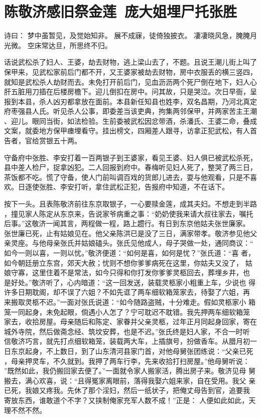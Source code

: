 \chapter{陈敬济感旧祭金莲~庞大姐埋尸托张胜}

诗曰：
梦中虽暂见，及觉始知非。
展不成寐，徒倚独披衣。
凄凄晓风急，腌腌月光微。
空床常达旦，所思终不归。

话说武松杀了妇人、王婆，劫去财物，逃上梁山去了，不题。且说王潮儿街上叫了
保甲来，见武松家前后门都不开，又王婆家被劫去财物，房中衣服丢的横三竖四，
就知是武松杀人劫财而去。未免打开前后门，见血沥沥两个死尸倒在地下，妇人心
肝五脏用刀插在后楼房檐下。迎儿倒扣在房中。问其故，只是哭泣。次日早衙，呈
报到本县，杀人凶刃都拿放在面前。本县新任知县也姓李，双名昌期，乃河北真定
府枣强县人氏。听见杀人公事，即委差当该吏典，拘集两邻保甲，并两家苦主王潮
、迎儿。眼同当街，如法检验。生前委被武松因忿带酒，杀潘氏、王婆二命，叠成
文案，就委地方保甲瘗埋看守。挂出榜文，四厢差人跟寻，访拿正犯武松，有人首
告者，官给赏银五十两。

守备府中张胜、李安打着一百两银子到王婆家，看见王婆、妇人俱已被武松杀死，
县中差人检尸，捉拿凶犯。二人回报到府中。春梅听见妇人死了，整哭了两三日，
茶饭都不吃。慌了守备，使人门前叫调百戏的货郎儿进去，耍与他观看，只是不喜
欢。日逐使张胜、李安打听，拿住武松正犯，告报府中知道，不在话下。

按下一头。且表陈敬济前往东京取银子，一心要赎金莲，成其夫妇。不想走到半路
，撞见家人陈定从东京来，告说家爷病重之事：“奶奶使我来请大叔往家去，嘱托
后事。”这敬济一闻其言，两程做一程，路上趱行。有日到东京他姑夫张世廉家。
张世廉已死，止有姑娘见在。他父亲陈洪已是没了三日，满家带孝。敬济参见他父
亲灵座。与他母亲张氏并姑娘磕头。张氏见他成人，母子哭做一处，通同商议：“
如今一则以喜，一则以忧。”敬济便道：“如何是喜，如何是忧？”张氏道：“喜
者，如今朝廷册立东宫，郊天大赦；忧则不想你爹爹病死在这里，你姑夫又没了，
姑娘守寡，这里住着不是常法，如今只得和你打发你爹爹灵柩回去，葬埋乡井，也
是好处。”敬济听了，心内暗道：“这一回发送，装载灵柩家小粗重上车，少说也
得许多日期耽阁，却不误了六姐？不如先诓了两车细软箱笼家去，待娶了六姐，再
来搬取灵柩不迟。”一面对张氏说道：“如今随路盗贼，十分难走。假如灵柩家小
箱笼一同起身，未免起眼，倘遇小人怎了？宁可耽迟不耽错。我先押两车细软箱笼
家去，收拾房屋。母亲随后和陈定、家眷并父亲灵柩，过年正月同起身回家，寄在
城外寺院，然后做斋念经、筑坟安葬，也是不迟。”张氏终是妇人家，不合一时听
信敬济巧言，就先打点细软箱笼，装载两大车，上插旗号，扮做香车。从腊月初一
日东京起身，不上数日，到了山东清河县家门首，对他母舅张团练说：“父亲已死
，母亲押灵车，不久就到。我押了两车行李，先来收拾打扫房屋。”他母舅听说：
”既然如此，我仍搬回家去便了。”一面就令家人搬家活，腾出房子来。敬济见母
舅搬去，满心欢喜，说：“且得冤家离眼前，落得我娶六姐来家，自在受用。我父
亲已死，我娘又疼我。先休了那个淫妇，然后一纸状子，把俺丈母告到官，追要我
寄放东西，谁敢道个不字？又挟制俺家充军人数不成！”正是：
人便如此如此，天理不然不然。

